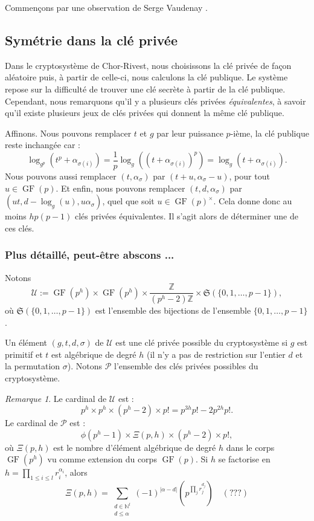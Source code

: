 \documentclass[a4paper, titlepage]{article}
\theoremstyle{definition}
\theoremstyle{remark}
\newtheorem{rema}[theo]{Remarque}
\def\N{\mathbb N}
\def\Z{\mathbb Z}
\def\gf{\operatorname{GF}}
\begin{document}
Commençons par une observation de Serge Vaudenay \cite[Section 3]{vaudenay2000}.

\subsection{Symétrie dans la clé privée}\label{symetrieClePrivee}

Dans le cryptosystème de Chor-Rivest, nous choisissons la clé privée de façon aléatoire puis, à partir de celle-ci, nous calculons la clé publique. Le système repose sur la difficulté de trouver une clé secrète à partir de la clé publique. Cependant, nous remarquons qu'il y a plusieurs clés privées \textit{équivalentes}, à savoir qu'il existe plusieurs jeux de clés privées qui donnent la même clé publique.

Affinons. Nous pouvons remplacer $t$ et $g$ par leur puissance $p$-ième, la clé publique reste inchangée car :
$$\log_{g^p}\left(t^p + \alpha_{\sigma(i)}\right) = \frac{1}{p}\log_{g}\left(\left(t + \alpha_{\sigma(i)}\right)^p\right) = \log_{g}\left(t + \alpha_{\sigma(i)}\right).$$
Nous pouvons aussi remplacer $(t, \alpha_{\sigma})$ par $(t + u, \alpha_{\sigma} - u)$, pour tout $u \in \gf(p)$. Et enfin, nous pouvons remplacer $(t,d,\alpha_\sigma)$ par $(ut, d - \log_g(u), u\alpha_\sigma)$, quel que soit $u \in \gf(p)^\times$.
Cela donne donc au moins $hp(p-1)$ clés privées équivalentes. Il s'agit alors de déterminer une de ces clés.

\subsubsection*{Plus détaillé, peut-être abscons ...}

Notons $$\mathcal{U} := \gf(p^h) \times \gf(p^h) \times \frac{\Z}{(p^h-2)\Z} \times \mathfrak{S}(\{0,1,\dots, p-1\}),$$
où $\mathfrak{S}(\{0,1,\dots, p-1\})$ est l'ensemble des bijections de l'ensemble $\{0,1,\dots, p-1\}$.

Un élément $(g, t, d, \sigma)$ de $\mathcal{U}$ est une clé privée possible du cryptosystème si $g$ est primitif et $t$ est algébrique de degré $h$ (il n'y a pas de restriction sur l'entier $d$ et la permutation $\sigma$). Notons $\mathcal{P}$ l'ensemble des clés privées possibles du cryptosystème.

\begin{rema}
Le cardinal de $\mathcal{U}$ est :
$$p^h \times p^h \times (p^h - 2) \times p! = p^{3h}p! - 2p^{2h}p!.$$
Le cardinal de $\mathcal{P}$ est :
$$\phi(p^h - 1) \times \Xi(p,h) \times (p^h - 2) \times p!,$$
où $\Xi(p, h)$ est le nombre d'élément algébrique de degré $h$ dans le corps $\gf(p^h)$ vu comme extension du corps $\gf(p)$. Si $h$ se factorise en $h = \prod_{1\leqslant i \leqslant l} r_i^{\alpha_{i}}$, alors
$$\Xi(p,h) = \sum_{\substack{d \in \N^l \\ d \leqslant \alpha}} (-1)^{|\alpha - d|} \left( p^{\prod_j r_j^{d_j}}\right)\quad(???)$$
\end{rema}
\end{document}
